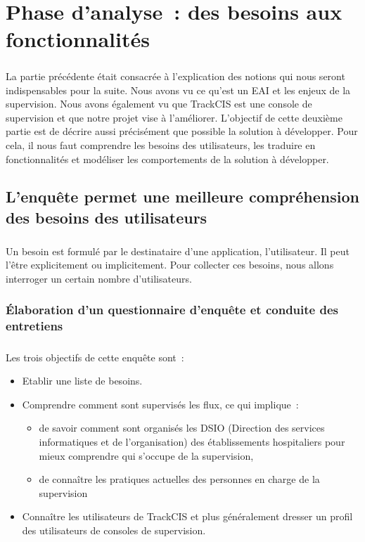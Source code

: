 \chapter{Phase d'analyse~: des besoins aux fonctionnalités}
	\paragraph{}
	La partie précédente était consacrée à l'explication des notions qui nous
	seront indispensables pour la suite. Nous avons vu
	ce qu'est un EAI et les enjeux de la supervision. Nous avons également vu que
	TrackCIS est une console de supervision et que notre projet vise à l'améliorer.
	L'objectif de cette deuxième partie est de décrire aussi précisément que
	possible la solution à développer. Pour cela, il nous faut comprendre les
	besoins des utilisateurs, les traduire en
	fonctionnalités et modéliser les comportements de la solution à développer.
	
	\section{L'enquête permet une meilleure compréhension des besoins des utilisateurs}
		\paragraph{}
		Un besoin est formulé par le destinataire d'une application, l'utilisateur. Il
		peut l'être explicitement ou implicitement. Pour collecter ces besoins, nous
		allons interroger un certain nombre d'utilisateurs.
		
		\subsection{Élaboration d'un questionnaire d'enquête et conduite des entretiens}
			\paragraph{}%
			Les trois objectifs de cette enquête sont~:
			\begin{itemize}
			  \item Etablir une liste de besoins.
			  \item Comprendre comment sont supervisés les flux, ce qui implique~:
			  \begin{itemize}
			    \item de savoir comment sont
			  	organisés les DSIO (Direction des services informatiques et de
			  	l’organisation) des établissements hospitaliers pour mieux comprendre qui
			  	s'occupe de la supervision,
			  	\item de connaître les pratiques actuelles des personnes en charge de la
			  	supervision
			  	\end{itemize}
			  \item Connaître les utilisateurs de TrackCIS et plus généralement dresser
			  un profil des utilisateurs de consoles de supervision.
			\end{itemize}
			
